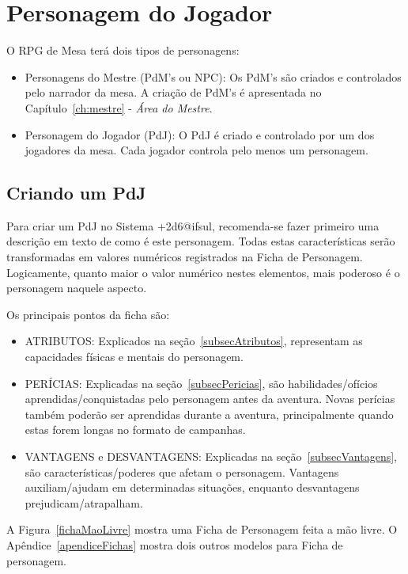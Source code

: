 \chapter{\label{ch:pdj}Personagem do Jogador}

O RPG de Mesa terá dois tipos de personagens: 
\begin{itemize}
	\item Personagens do Mestre (PdM's ou NPC): Os PdM's são criados e controlados pelo narrador da mesa. A criação de PdM's é apresentada no Capítulo~\ref{ch:mestre} - \emph{Área do Mestre}.

	\item Personagem do Jogador (PdJ): O PdJ é criado e controlado por um dos jogadores da mesa. Cada jogador controla pelo menos um personagem.
\end{itemize}

\section{\label{sec:pdj}Criando um PdJ}

Para criar um PdJ no Sistema +2d6@ifsul, recomenda-se fazer primeiro uma descrição em texto de como é este personagem. Todas estas características serão transformadas em valores numéricos registrados na Ficha de Personagem. Logicamente, quanto maior o valor numérico nestes elementos, mais poderoso é o personagem naquele aspecto.

Os principais pontos da ficha são: 

\begin{itemize}
	\item ATRIBUTOS: Explicados na seção~\ref{subsecAtributos}, representam as capacidades físicas e mentais do personagem.
	\item PERÍCIAS: Explicadas na seção~\ref{subsecPericias}, são habilidades/ofícios aprendidas/conquistadas pelo personagem antes da aventura. Novas perícias também poderão ser aprendidas durante a aventura, principalmente quando estas forem longas no formato de campanhas.
	\item VANTAGENS e DESVANTAGENS: Explicadas na seção~\ref{subsecVantagens}, são características/poderes que afetam o personagem. Vantagens auxiliam/ajudam em determinadas situações, enquanto desvantagens prejudicam/atrapalham.
\end{itemize}

A Figura~\ref{fichaMaoLivre} mostra uma Ficha de Personagem feita a mão livre. O Apêndice~\ref{apendiceFichas} mostra dois outros modelos para Ficha de personagem. 

